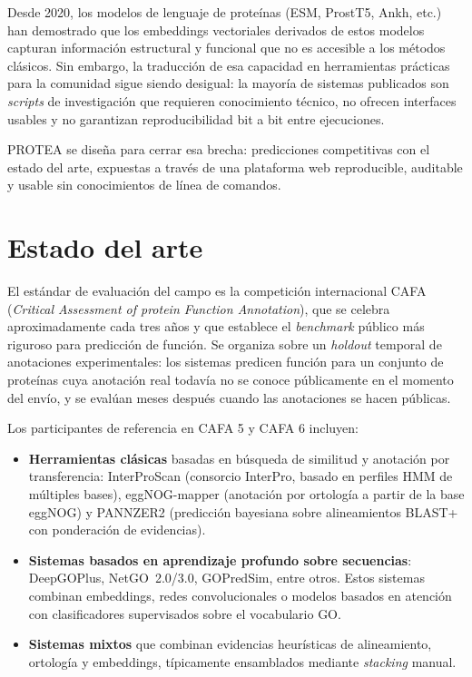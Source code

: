 \documentclass[11pt,a4paper]{article}
\begin{document}
Desde 2020, los modelos de lenguaje de proteínas (ESM, ProstT5, Ankh, etc.) han
demostrado que los embeddings vectoriales derivados de estos modelos capturan
información estructural y funcional que no es accesible a los métodos clásicos.
Sin embargo, la traducción de esa capacidad en herramientas prácticas para la
comunidad sigue siendo desigual: la mayoría de sistemas publicados son
\emph{scripts} de investigación que requieren conocimiento técnico, no ofrecen
interfaces usables y no garantizan reproducibilidad bit a bit entre
ejecuciones.

PROTEA se diseña para cerrar esa brecha: predicciones competitivas con el
estado del arte, expuestas a través de una plataforma web reproducible,
auditable y usable sin conocimientos de línea de comandos.

\section{Estado del arte}

El estándar de evaluación del campo es la competición internacional CAFA
(\emph{Critical Assessment of protein Function Annotation}), que se celebra
aproximadamente cada tres años y que establece el \emph{benchmark} público más
riguroso para predicción de función. Se organiza sobre un \emph{holdout}
temporal de anotaciones experimentales: los sistemas predicen función para un
conjunto de proteínas cuya anotación real todavía no se conoce públicamente en
el momento del envío, y se evalúan meses después cuando las anotaciones se
hacen públicas.

Los participantes de referencia en CAFA 5 y CAFA 6 incluyen:

\begin{itemize}[leftmargin=1.5em]
  \item \textbf{Herramientas clásicas} basadas en búsqueda de similitud y
    anotación por transferencia: InterProScan (consorcio InterPro, basado en
    perfiles HMM de múltiples bases), eggNOG-mapper (anotación por ortología a
    partir de la base eggNOG) y PANNZER2 (predicción bayesiana sobre alineamientos
    BLAST+ con ponderación de evidencias).
  \item \textbf{Sistemas basados en aprendizaje profundo sobre secuencias}:
    DeepGOPlus, NetGO~2.0/3.0, GOPredSim, entre otros. Estos sistemas combinan
    embeddings, redes convolucionales o modelos basados en atención con
    clasificadores supervisados sobre el vocabulario GO.
  \item \textbf{Sistemas mixtos} que combinan evidencias heurísticas de
    alineamiento, ortología y embeddings, típicamente ensamblados mediante
    \emph{stacking} manual.
\end{itemize}
\end{document}
